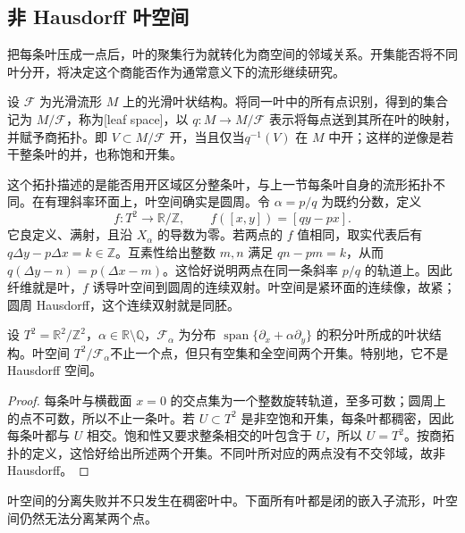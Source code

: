 \subsection{非 Hausdorff 叶空间}
\label{g1:subsec:1305:03}

把每条叶压成一点后，叶的聚集行为就转化为商空间的邻域关系。开集能否将不同叶分开，将决定这个商能否作为通常意义下的流形继续研究。

\begin{definition}
	\label{g1:def:leaf-space}
	设 \(\mathcal F\) 为光滑流形 \(M\) 上的光滑叶状结构。将同一叶中的所有点识别，得到的集合记为 \(M/\mathcal F\)，称为[leaf space]，以 \(q:M\to M/\mathcal F\) 表示将每点送到其所在叶的映射，并赋予商拓扑。即 \(V\subset M/\mathcal F\) 开，当且仅当\(q^{-1}(V)\) 在 \(M\) 中开；这样的逆像是若干整条叶的并，也称饱和开集。
\end{definition}

这个拓扑描述的是能否用开区域区分整条叶，与上一节每条叶自身的流形拓扑不同。在有理斜率环面上，叶空间确实是圆周。令 \(\alpha=p/q\) 为既约分数，定义
\[
	f:T^2\longrightarrow\mathbb R/\mathbb Z,\qquad f([x,y])=[qy-px].
\]
它良定义、满射，且沿 \(X_\alpha\) 的导数为零。若两点的 \(f\) 值相同，取实代表后有 \(q\Delta y-p\Delta x=k\in\mathbb Z\)。互素性给出整数 \(m,n\) 满足 \(qn-pm=k\)，从而 \(q(\Delta y-n)=p(\Delta x-m)\)。这恰好说明两点在同一条斜率 \(p/q\) 的轨道上。因此纤维就是叶，\(f\) 诱导叶空间到圆周的连续双射。叶空间是紧环面的连续像，故紧；圆周 Hausdorff，这个连续双射就是同胚。

\begin{proposition}
	\label{g1:prop:irrational-leaf-quotient}
	设 \(T^2=\mathbb R^2/\mathbb Z^2\)，\(\alpha\in\mathbb R\setminus\mathbb Q\)，\(\mathcal F_\alpha\) 为分布 \(\operatorname{span}\{\partial_x+\alpha\partial_y\}\) 的积分叶所成的叶状结构。叶空间 \(T^2/\mathcal F_\alpha\)不止一个点，但只有空集和全空间两个开集。特别地，它不是 Hausdorff 空间。
\end{proposition}
\begin{proof}
	每条叶与横截面 \(x=0\) 的交点集为一个整数旋转轨道，至多可数；圆周上的点不可数，所以不止一条叶。若 \(U\subset T^2\) 是非空饱和开集，每条叶都稠密，因此每条叶都与 \(U\) 相交。饱和性又要求整条相交的叶包含于 \(U\)，所以 \(U=T^2\)。按商拓扑的定义，这恰好给出所述两个开集。不同叶所对应的两点没有不交邻域，故非 Hausdorff。
\end{proof}

叶空间的分离失败并不只发生在稠密叶中。下面所有叶都是闭的嵌入子流形，叶空间仍然无法分离某两个点。

